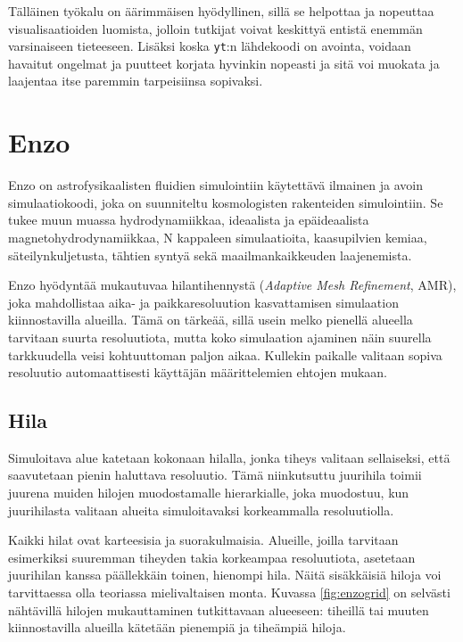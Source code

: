 \documentclass[12pt,a4paper]{article}
\newcommand{\yt}{\texttt{yt}}
\begin{document}
Tälläinen työkalu on äärimmäisen hyödyllinen, sillä se helpottaa ja nopeuttaa visualisaatioiden luomista, jolloin tutkijat voivat keskittyä entistä enemmän varsinaiseen tieteeseen. Lisäksi koska \yt :n lähdekoodi on avointa, voidaan havaitut ongelmat ja puutteet korjata hyvinkin nopeasti ja sitä voi muokata ja laajentaa itse paremmin tarpeisiinsa sopivaksi.


\section{Enzo}
Enzo on astrofysikaalisten fluidien simulointiin käytettävä ilmainen ja avoin simulaatiokoodi, joka on suunniteltu kosmologisten rakenteiden simulointiin. Se tukee muun muassa hydrodynamiikkaa, ideaalista ja epäideaalista magnetohydrodynamiikkaa, N kappaleen simulaatioita, kaasupilvien kemiaa, säteilynkuljetusta, tähtien syntyä sekä maailmankaikkeuden laajenemista. \cite{enzo}

Enzo hyödyntää mukautuvaa hilantihennystä (\textit{Adaptive Mesh Refinement}, AMR), joka mahdollistaa aika- ja paikkaresoluution kasvattamisen simulaation kiinnostavilla alueilla. Tämä on tärkeää, sillä usein melko pienellä alueella tarvitaan suurta resoluutiota, mutta koko simulaation ajaminen näin suurella tarkkuudella veisi kohtuuttoman paljon aikaa. Kullekin paikalle valitaan sopiva resoluutio automaattisesti käyttäjän määrittelemien ehtojen mukaan. \cite{enzo}

\subsection{Hila}
Simuloitava alue katetaan kokonaan hilalla, jonka tiheys valitaan sellaiseksi, että saavutetaan pienin haluttava resoluutio. Tämä niinkutsuttu juurihila toimii juurena muiden hilojen muodostamalle hierarkialle, joka muodostuu, kun juurihilasta valitaan alueita simuloitavaksi korkeammalla resoluutiolla.\cite{enzo}
	
Kaikki hilat ovat karteesisia ja suorakulmaisia. Alueille, joilla tarvitaan esimerkiksi suuremman tiheyden takia korkeampaa resoluutiota, asetetaan juurihilan kanssa päällekkäin toinen, hienompi hila. Näitä sisäkkäisiä hiloja voi tarvittaessa olla teoriassa mielivaltaisen monta. Kuvassa \ref{fig:enzogrid} on selvästi nähtävillä hilojen mukauttaminen tutkittavaan alueeseen: tiheillä tai muuten kiinnostavilla alueilla kätetään pienempiä ja tiheämpiä hiloja. \cite{enzo} %
\end{document}
